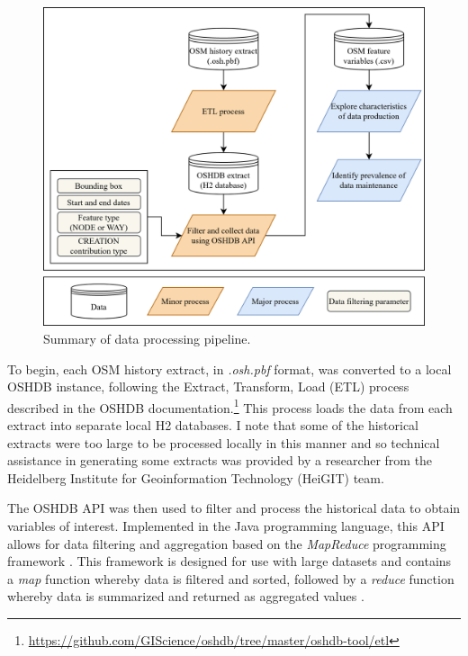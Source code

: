 \begin{figure} %
    \centering %
    \includegraphics[width = \textwidth]{Images/Datapipeline.png} %
    \caption{Summary of data processing pipeline.} %
    \label{fig:pipe} %
\end{figure}

To begin, each OSM history extract, in \textit{.osh.pbf} format, was converted to a local OSHDB instance, following the Extract, Transform, Load (ETL) process described in the OSHDB documentation.\footnote{\url{https://github.com/GIScience/oshdb/tree/master/oshdb-tool/etl}} This process loads the data from each extract into separate local H2 databases. I note that some of the historical extracts were too large to be processed locally in this manner and so technical assistance in generating some extracts was provided by a researcher from the Heidelberg Institute for Geoinformation Technology (HeiGIT) team. 

The OSHDB API \parencite{raifer_oshdb_2019} was then used to filter and process the historical data to obtain variables of interest.  Implemented in the Java programming language, this API allows for data filtering and aggregation based on the \textit{MapReduce} programming framework \parencite{raifer_oshdb_2019}. This framework is designed for use with large datasets and contains a \textit{map} function whereby data is filtered and sorted, followed by a \textit{reduce} function whereby data is summarized and returned as aggregated values \parencite{dean_mapreduce_2008}.

